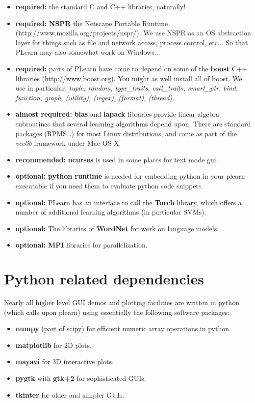 \documentclass[11pt]{book}
\begin{document}
\begin{itemize}
\item {\bf required:} the standard C and C++ libraries, naturally!
\item {\bf required:} {\bf NSPR} the Netscape Portable Runtime
  (http://www.mozilla.org/projects/nspr/). We use NSPR as an OS abstraction
  layer for things such as file and network access, process control,
  etc... So that PLearn may also somewhat work on Windows...
\item {\bf required:} parts of PLearn have come to depend on some of the
  {\bf boost} C++ libraries (http://www.boost.org). You might as well install all
  of boost. We use in particular: {\em tuple, random, type\_traits, call\_traits, smart\_ptr, bind, function, graph, (utility), (regex), (format), (thread).}
\item {\bf almost required:} {\bf blas} and {\bf lapack} libraries provide linear algebra
  subroutines that several learning algorithms depend upon. There are standard
  packages (RPMS\ldots) for most Linux distributions, and come as part of
  the {\em veclib} framework under Mac OS X.
\item {\bf recommended:} {\bf ncurses} is used in some places for text mode
  gui.
\item {\bf optional:} {\bf python runtime} is needed for embedding python
  in your plearn executable if you need them to evaluate python code snippets.
\item {\bf optional:} PLearn has an interface to call the {\bf Torch}
  library, which offers a number of additional learning algorithms (in particular SVMs). 
\item {\bf optional:} The libraries of {\bf WordNet} for work on language
  models.
\item {\bf optional:} {\bf MPI} libraries for parallelization.
\end{itemize}

\section{Python related dependencies}

Nearly all higher level GUI demos and plotting facilities are written in
python (which calls upon plearn) using essentially the following software
packages: \\
\begin{itemize}
\item {\bf numpy} (part of scipy) for efficient numeric array operations in python.
\item {\bf matplotlib} for 2D plots.
\item {\bf mayavi} for 3D interactive plots.
\item {\bf pygtk} with {\bf gtk+2} for sophisticated GUIs.
\item {\bf tkinter} for older and simpler GUIs.
\end{itemize}
\end{document}
